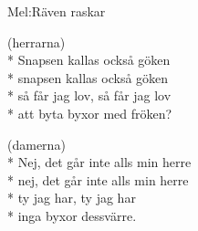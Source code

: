 \begin{SongText}[Göken]
    \begin{SongInfo}
        Mel:Räven raskar
    \end{SongInfo}
    \begin{SongVerse}
        (herrarna)\\*%
        Snapsen kallas också göken\\*%
        snapsen kallas också göken\\*%
        så får jag lov, så får jag lov\\*%
        att byta byxor med fröken?
    \end{SongVerse}
    \begin{SongVerse}
        (damerna)\\*%
        Nej, det går inte alls min herre\\*%
        nej, det går inte alls min herre\\*%
        ty jag har, ty jag har\\*%
        inga byxor dessvärre.
    \end{SongVerse}
\end{SongText}
